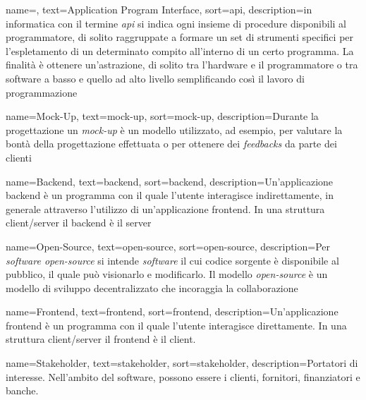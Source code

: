 {
    name=,
    text=Application Program Interface,
    sort=api,
    description={in informatica con il termine \emph{\acrfull{api}} si indica ogni insieme di procedure disponibili al programmatore, di solito raggruppate a formare un set di strumenti specifici per l'espletamento di un determinato compito all'interno di un certo programma. La finalità è ottenere un'astrazione, di solito tra l'hardware e il programmatore o tra software a basso e quello ad alto livello semplificando così il lavoro di programmazione}
}


{
    name=Mock-Up,
    text=mock-up,
    sort=mock-up,
    description={Durante la progettazione un \emph{mock-up} è un modello utilizzato, ad esempio, per valutare la bontà della progettazione effettuata o per ottenere dei \emph{feedbacks} da parte dei clienti}
}

{
    name=Backend,
    text=backend,
    sort=backend,
    description={Un'applicazione backend è un programma con il quale l'utente interagisce indirettamente, in generale attraverso l'utilizzo di un'applicazione \gls{frontend}. In una struttura client/server il backend è il server}
}

{
    name=Open-Source,
    text=open-source,
    sort=open-source,
    description={Per \emph{software open-source} si intende \emph{software} il cui codice sorgente è disponibile al pubblico, il quale può visionarlo e modificarlo. Il modello \emph{open-source} è un modello di sviluppo decentralizzato che incoraggia la collaborazione}
}

{
    name=Frontend,
    text=frontend,
    sort=frontend,
    description={Un'applicazione frontend è un programma con il quale l'utente interagisce direttamente. In una struttura client/server il frontend è il client.}
}

{
    name=Stakeholder,
    text=stakeholder,
    sort=stakeholder,
    description={Portatori di interesse. Nell'ambito del software, possono essere i clienti, fornitori, finanziatori e banche.}
}
